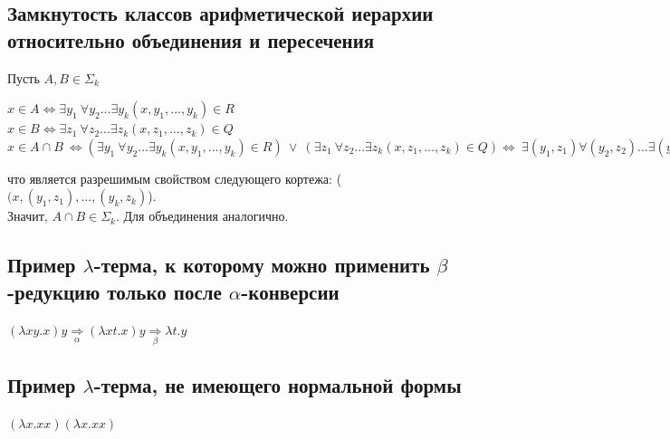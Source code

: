 \subsection{Замкнутость классов арифметической иерархии относительно объединения и пересечения}
Пусть $A,B \in \Sigma_k$
\begin{center}
    $x \in A \Leftrightarrow \exists y_1\ \forall y_2 ... \exists y_k (x,y_1,...,y_k) \in R$ \\
    $x \in B \Leftrightarrow \exists z_1\ \forall z_2 ... \exists z_k (x,z_1,...,z_k) \in Q$
    \\
    $x \in A \cap B \ \Longleftrightarrow (\exists y_1\ \forall y_2 ... \exists y_k (x,y_1,...,y_k) \in R) \ \vee \ (\exists z_1\ \forall z_2 ... \exists z_k (x,z_1,...,z_k) \in Q)  \Longleftrightarrow \ \exists(y_1,z_1) \forall (y_2,z_2) ... \exists(y_k,z_k)((x,y_1,...,y_k) \in R \wedge (x,z_1,...,z_k) \in Q)$ 
\end{center}
что является разрешимым свойством следующего кортежа: ($(x,(y_1,z_1),...,(y_k,z_k)$).\\ Значит, $A \cap B \in \Sigma_k$. Для объединения аналогично.

\subsection{Пример $\lambda$-терма, к которому можно применить $\beta$-редукцию только после $\alpha$-конверсии}
$(\lambda xy.x)y \underset{\alpha}{\Longrightarrow}(\lambda xt.x)y \underset{\beta}{\Longrightarrow}\lambda t.y$

\subsection{Пример $\lambda$-терма, не имеющего нормальной формы} $(\lambda x.xx)(\lambda x.xx)$

